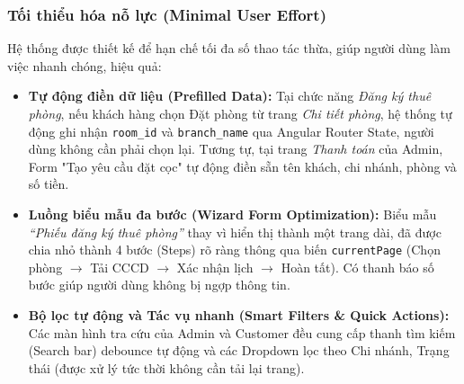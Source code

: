 \subsubsection{Tối thiểu hóa nỗ lực (Minimal User Effort)}
Hệ thống được thiết kế để hạn chế tối đa số thao tác thừa, giúp người dùng làm việc nhanh chóng, hiệu quả:
\begin{itemize}[leftmargin=*, nosep]
    \item \textbf{Tự động điền dữ liệu (Prefilled Data):} Tại chức năng \textit{Đăng ký thuê phòng}, nếu khách hàng chọn Đặt phòng từ trang \textit{Chi tiết phòng}, hệ thống tự động ghi nhận \texttt{room\_id} và \texttt{branch\_name} qua Angular Router State, người dùng không cần phải chọn lại. Tương tự, tại trang \textit{Thanh toán} của Admin, Form "Tạo yêu cầu đặt cọc" tự động điền sẵn tên khách, chi nhánh, phòng và số tiền.
    \item \textbf{Luồng biểu mẫu đa bước (Wizard Form Optimization):} Biểu mẫu \textit{``Phiếu đăng ký thuê phòng''} thay vì hiển thị thành một trang dài, đã được chia nhỏ thành 4 bước (Steps) rõ ràng thông qua biến \texttt{currentPage} (Chọn phòng $\rightarrow$ Tải CCCD $\rightarrow$ Xác nhận lịch $\rightarrow$ Hoàn tất). Có thanh báo số bước giúp người dùng không bị ngợp thông tin.
    \item \textbf{Bộ lọc tự động và Tác vụ nhanh (Smart Filters \& Quick Actions):} Các màn hình tra cứu của Admin và Customer đều cung cấp thanh tìm kiếm (Search bar) debounce tự động và các Dropdown lọc theo Chi nhánh, Trạng thái (được xử lý tức thời không cần tải lại trang).
\end{itemize}

